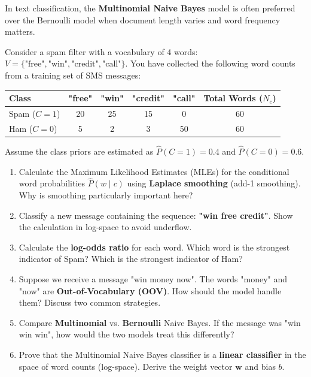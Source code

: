 \documentclass[12pt]{article}
\begin{document}
In text classification, the \textbf{Multinomial Naive Bayes} model is often preferred over the Bernoulli model when document length varies and word frequency matters.

Consider a spam filter with a vocabulary of 4 words: $V = \{\text{"free"}, \text{"win"}, \text{"credit"}, \text{"call"}\}$.
You have collected the following word counts from a training set of SMS messages:

\begin{center}
\begin{tabular}{|l|c|c|c|c|c|}
\hline
\textbf{Class} & \textbf{"free"} & \textbf{"win"} & \textbf{"credit"} & \textbf{"call"} & \textbf{Total Words ($N_c$)} \\
\hline
Spam ($C=1$) & 20 & 25 & 15 & 0 & 60 \\
Ham ($C=0$) & 5 & 2 & 3 & 50 & 60 \\
\hline
\end{tabular}
\end{center}

Assume the class priors are estimated as $\hat{P}(C=1) = 0.4$ and $\hat{P}(C=0) = 0.6$.

\begin{enumerate}[label=(\alph*)]
    \item Calculate the Maximum Likelihood Estimates (MLEs) for the conditional word probabilities $\hat{P}(w \mid c)$ using \textbf{Laplace smoothing} (add-1 smoothing). Why is smoothing particularly important here?

    \item Classify a new message containing the sequence: \textbf{"win free credit"}. Show the calculation in log-space to avoid underflow.

    \item Calculate the \textbf{log-odds ratio} for each word. Which word is the strongest indicator of Spam? Which is the strongest indicator of Ham?

    \item Suppose we receive a message "win money now". The words "money" and "now" are \textbf{Out-of-Vocabulary (OOV)}. How should the model handle them? Discuss two common strategies.

    \item Compare \textbf{Multinomial} vs. \textbf{Bernoulli} Naive Bayes. If the message was "win win win", how would the two models treat this differently?

    \item Prove that the Multinomial Naive Bayes classifier is a \textbf{linear classifier} in the space of word counts (log-space). Derive the weight vector $\mathbf{w}$ and bias $b$.
\end{enumerate}
\end{document}
